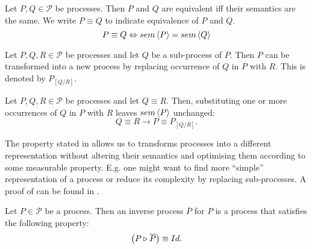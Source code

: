 \begin{definition}
\label{def:process_equivalence}
Let $P, Q \in \mathcal{P}$ be processes. Then $P$ and $Q$ are equivalent iff their semantics are the same. We write $P \equiv Q$ to indicate equivalence of $P$ and $Q$.
  \begin{equation*}
    \label{eqn:equivalence}
    P \equiv Q \Leftrightarrow sem \left\langle P \right\rangle = sem \left\langle Q \right\rangle
  \end{equation*}
  \hfill\qedsymbol
\end{definition}


\begin{definition}
\label{def:process_substitution}
Let $P, Q, R \in \mathcal{P}$ be processes and let $Q$ be a sub-process of $P$. Then $P$ can be transformed into a new process by replacing occurrence of $Q$ in $P$ with $R$. This is denoted by $P_{\left[ Q / R \right]}$.

\hfill\qedsymbol
\end{definition}



\begin{theorem}
\label{thm:process_substitution}
Let $P, Q, R \in \mathcal{P}$ be processes and let $Q \equiv R$. Then, substituting one or more occurrences of $Q$ in $P$ with $R$ leaves $sem \left\langle P \right\rangle$ unchanged:
  \begin{equation*}
    Q \equiv R \rightarrow P \equiv P_{\left[ Q / R \right]}.
  \end{equation*}
  
  \hfill\qedsymbol
\end{theorem}


The property stated in  allows us to transforms processes into a different representation without altering their semantics and optimising them according to some measurable property. E.g. one might want to find more \enquote{simple} representation of a process or reduce its complexity by replacing sub-processes. A proof of  can be found in .

\begin{definition}
\label{def:inverse_process}
Let $P \in \mathcal{P}$ be a process. Then an inverse process $\overline{P}$ for $P$ is a process that satisfies the following property:
  \begin{equation*}
    \left( P \triangleright \overline{P} \right) \equiv Id.
  \end{equation*}
  \hfill\qedsymbol
\end{definition}

